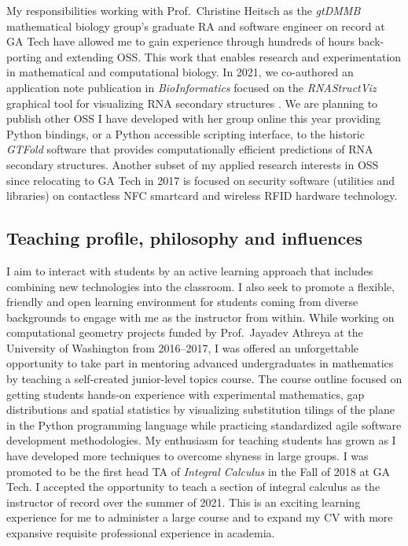 \documentclass[10pt,reqno,letterpaper]{article}
\theoremstyle{plain}
\numberwithin{theorem}{section}
\theoremstyle{definition}
\begin{document}
My responsibilities working with 
Prof.~Christine Heitsch as the \emph{gtDMMB} mathematical biology group's graduate RA and 
software engineer on record at GA Tech have allowed me to gain experience through 
hundreds of hours back-porting and extending OSS. This work that enables research and experimentation 
in mathematical and computational biology. 
In 2021, we co-authored an application note publication in \emph{BioInformatics} 
focused on the \emph{RNAStructViz} graphical tool for visualizing RNA secondary structures 
\cite{MDS-NO-21}. 
We are planning to publish other OSS I have developed with her group online this year providing 
Python bindings, or a Python accessible scripting interface, to the historic \emph{GTFold} software 
\cite{GTFOLD-PUB-REFERENCE} 
that provides computationally efficient predictions of RNA secondary structures. 
Another subset of my applied research interests in OSS since relocating to GA Tech in 2017 
is focused on security software (utilities and libraries) on contactless NFC smartcard and wireless RFID 
hardware technology. 

\subsection{Teaching profile, philosophy and influences} 

I aim to interact with students by an active learning approach 
that includes combining new technologies into the classroom. 
I also seek to promote a flexible, friendly and open learning environment for 
students coming from diverse backgrounds to engage with me as the instructor from within.
While working on computational geometry projects funded by 
Prof.~Jayadev Athreya at the University of Washington from 2016--2017, 
I was offered an unforgettable opportunity to take part in mentoring advanced undergraduates 
in mathematics by teaching a self-created junior-level topics course. The course outline 
focused on getting students hands-on experience with experimental mathematics, 
gap distributions and spatial statistics by visualizing substitution tilings of the 
plane in the Python programming language while practicing 
standardized agile software development methodologies. 
My enthusiasm for teaching students 
has grown as I have developed more techniques to overcome shyness in large groups. 
I was promoted to be the first head TA of \emph{Integral Calculus} in the Fall of 2018 at GA Tech. 
I accepted the opportunity to teach a section of integral calculus 
as the instructor of record over the summer of 2021. 
This is an exciting learning experience for me to administer a large course 
and to expand my CV with more expansive requisite professional experience in academia. 
\end{document}
